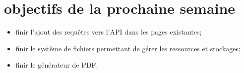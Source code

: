 \documentclass[a4paper, 12pt]{report}
\begin{document}
	\chapter{objectifs de la prochaine semaine}
		\begin{itemize}
			\item finir l’ajout des requêtes vers l’API dans les pages existantes;
			\item finir le système de fichiers permettant de gérer les ressources et stockages;
			\item finir le générateur de PDF.

		\end{itemize}
		
\end{document}
